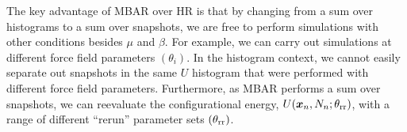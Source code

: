\documentclass[journal=jced,manuscript=article]{achemso}
\newcommand{\bfv}[1]{{\mbox{\boldmath{$#1$}}}}
\newcommand{\x}{\bfv{x}}
\begin{document}
%
%

The key advantage of MBAR over HR is that by changing from a sum over histograms to a sum over snapshots, we are free to perform simulations with other conditions besides $\mu$ and $\beta$. For example, we can carry out simulations at different force field parameters $(\theta_i)$. In the histogram context, we cannot easily separate out snapshots in the same $U$ histogram that were performed with different force field parameters. Furthermore, as MBAR performs a sum over snapshots, we can reevaluate the configurational energy, $U(\x_{n},N_n;\theta_{\rm rr})$, with a range of different ``rerun'' parameter sets $(\theta_{\rm rr})$.
\end{document}
